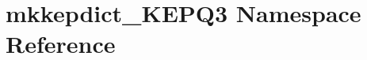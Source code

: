 \hypertarget{namespacemkkepdict__KEPQ3}{\section{mkkepdict\-\_\-\-K\-E\-P\-Q3 Namespace Reference}
\label{namespacemkkepdict__KEPQ3}
}
